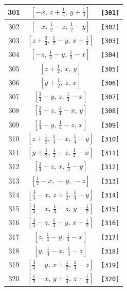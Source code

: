 \documentclass[fleqn,8pt]{jsarticle}
\begin{document}
\begin{longtable}{ccc}
301 & $\left[ - x,\, z + \frac{1}{4},\, y + \frac{1}{4} \right]$ & {\tt [301]} \\ \hline
302 & $\left[ - x,\, \frac{1}{2} - z,\, \frac{1}{2} - y \right]$ & {\tt [302]} \\ \hline
303 & $\left[ z + \frac{3}{4},\, \frac{1}{2} - y,\, x + \frac{1}{4} \right]$ & {\tt [303]} \\ \hline
304 & $\left[ - z,\, \frac{1}{2} - y,\, \frac{1}{2} - x \right]$ & {\tt [304]} \\ \hline
305 & $\left[ z + \frac{1}{2},\, x,\, y \right]$ & {\tt [305]} \\ \hline
306 & $\left[ y + \frac{1}{2},\, z,\, x \right]$ & {\tt [306]} \\ \hline
307 & $\left[ \frac{3}{4} - y,\, z,\, \frac{1}{4} - x \right]$ & {\tt [307]} \\ \hline
308 & $\left[ \frac{3}{4} - z,\, \frac{1}{4} - x,\, y \right]$ & {\tt [308]} \\ \hline
309 & $\left[ \frac{3}{4} - y,\, \frac{1}{4} - z,\, x \right]$ & {\tt [309]} \\ \hline
310 & $\left[ z + \frac{1}{2},\, \frac{1}{4} - x,\, \frac{1}{4} - y \right]$ & {\tt [310]} \\ \hline
311 & $\left[ y + \frac{1}{2},\, \frac{1}{4} - z,\, \frac{1}{4} - x \right]$ & {\tt [311]} \\ \hline
312 & $\left[ \frac{3}{4} - z,\, x,\, \frac{1}{4} - y \right]$ & {\tt [312]} \\ \hline
313 & $\left[ \frac{1}{2} - x,\, - y,\, - z \right]$ & {\tt [313]} \\ \hline
314 & $\left[ \frac{3}{4} - x,\, z + \frac{1}{2},\, \frac{1}{4} - y \right]$ & {\tt [314]} \\ \hline
315 & $\left[ \frac{3}{4} - x,\, \frac{1}{4} - z,\, y + \frac{1}{2} \right]$ & {\tt [315]} \\ \hline
316 & $\left[ \frac{3}{4} - z,\, \frac{1}{4} - y,\, x + \frac{1}{2} \right]$ & {\tt [316]} \\ \hline
317 & $\left[ z,\, \frac{1}{4} - y,\, \frac{1}{4} - x \right]$ & {\tt [317]} \\ \hline
318 & $\left[ y,\, \frac{1}{4} - x,\, \frac{1}{4} - z \right]$ & {\tt [318]} \\ \hline
319 & $\left[ \frac{3}{4} - y,\, x + \frac{1}{2},\, \frac{1}{4} - z \right]$ & {\tt [319]} \\ \hline
320 & $\left[ \frac{1}{2} - x,\, y + \frac{1}{4},\, z + \frac{1}{4} \right]$ & {\tt [320]} \\ \hline

\end{longtable}
\end{document}
